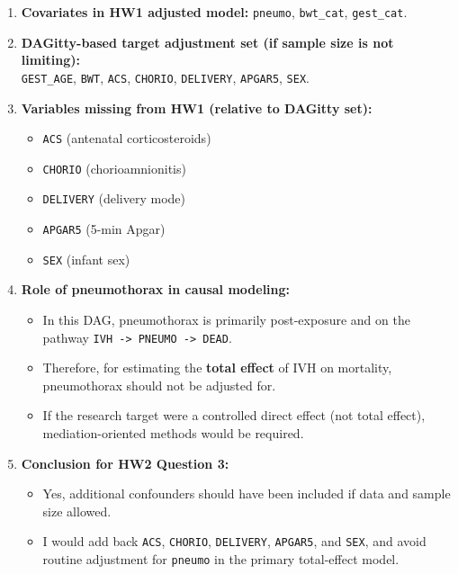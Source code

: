 \documentclass[
]{article}
\providecommand{\tightlist}{%
  \setlength{\itemsep}{0pt}\setlength{\parskip}{0pt}}
\begin{document}
\begin{enumerate}
\def\labelenumi{\arabic{enumi}.}
\item
  \textbf{Covariates in HW1 adjusted model:} \texttt{pneumo},
  \texttt{bwt\_cat}, \texttt{gest\_cat}.
\item
  \textbf{DAGitty-based target adjustment set (if sample size is not
  limiting):}\\
  \texttt{GEST\_AGE}, \texttt{BWT}, \texttt{ACS}, \texttt{CHORIO},
  \texttt{DELIVERY}, \texttt{APGAR5}, \texttt{SEX}.
\item
  \textbf{Variables missing from HW1 (relative to DAGitty set):}

  \begin{itemize}
  \tightlist
  \item
    \texttt{ACS} (antenatal corticosteroids)
  \item
    \texttt{CHORIO} (chorioamnionitis)
  \item
    \texttt{DELIVERY} (delivery mode)
  \item
    \texttt{APGAR5} (5-min Apgar)
  \item
    \texttt{SEX} (infant sex)
  \end{itemize}
\item
  \textbf{Role of pneumothorax in causal modeling:}

  \begin{itemize}
  \tightlist
  \item
    In this DAG, pneumothorax is primarily post-exposure and on the
    pathway
    \texttt{IVH\ -\textgreater{}\ PNEUMO\ -\textgreater{}\ DEAD}.
  \item
    Therefore, for estimating the \textbf{total effect} of IVH on
    mortality, pneumothorax should not be adjusted for.
  \item
    If the research target were a controlled direct effect (not total
    effect), mediation-oriented methods would be required.
  \end{itemize}
\item
  \textbf{Conclusion for HW2 Question 3:}

  \begin{itemize}
  \tightlist
  \item
    Yes, additional confounders should have been included if data and
    sample size allowed.
  \item
    I would add back \texttt{ACS}, \texttt{CHORIO}, \texttt{DELIVERY},
    \texttt{APGAR5}, and \texttt{SEX}, and avoid routine adjustment for
    \texttt{pneumo} in the primary total-effect model.
  \end{itemize}
\end{enumerate}
\end{document}
